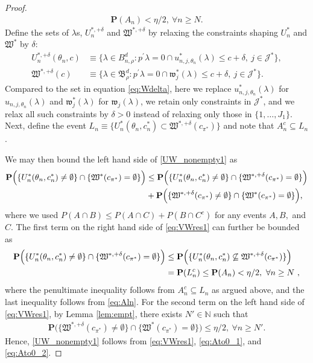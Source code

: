 \documentclass[letterpaper,11pt]{article}
\theoremstyle{myplain}
\theoremstyle{mydefinition}
\theoremstyle{myremark}
\newcommand{\cJ}{\mathcal{J}}
\numberwithin{equation}{section}
\numberwithin{figure}{section}
\begin{document}
\begin{appendices}
\begin{proof}
\begin{align}
\mathbf{P}(A_{n})< \eta/2,~\forall n \ge N.\label{eq:Aln}
\end{align}
Define the sets of $\lambda$s, $U_n^{*,+\delta}$ and $\mathfrak{W}^{*,+\delta}$ by relaxing the constraints shaping  $U_n^*$ and $\mathfrak{W}^{*}$ by $\delta$:
\begin{align}
U_n^{*,+\delta}(\theta_n,c) &\equiv \{\lambda\in  B^d_{n,\rho}: p^\prime \lambda =0 \cap u^*_{n,j,\theta_n}(\lambda)\le c+\delta,~j \in \cJ^*\},\\
\mathfrak W^{*,+\delta}(c)&\equiv \{\lambda\in  \mathfrak B^d_\rho: p^\prime \lambda =0 \cap \mathfrak{w}^*_{j}(\lambda)\le c+\delta,~j \in \cJ^*\}.
\end{align}
Compared to the set in equation \eqref{eq:Wdelta}, here we replace $u^*_{n,j,\theta_n}(\lambda)$ for $u_{n,j,\theta_n}(\lambda)$ and $\mathfrak{w}^*_{j}(\lambda)$ for $\mathfrak{w}_{j}(\lambda)$, we retain only constraints in $\cJ^*$, and we relax all such constraints by $\delta>0$ instead of relaxing only those in $\{1,\dots,J_1\}$.
Next, define the event $L_{ n}\equiv\{ U_n^{*}(\theta_n,c^*_n)\subset \mathfrak W^{*,+\delta}(c_{\pi^*})\}$ and note that $A^c_{n}\subseteq L_{n}$. 

We may then bound the left hand side of \eqref{UW_nonempty1} as
\begin{align}
\mathbf{P}\Big(\{ U^*_{n}(\theta_n,c^*_n)\ne \emptyset \} \cap \{\mathfrak W^{*}(c_{\pi^*})= \emptyset \}\Big)
&\le \mathbf{P}\Big( \{ U^{*}_{n}(\theta_n,c^*_n)\ne \emptyset \} \cap \{\mathfrak W^{*,+\delta}(c_{\pi^*})=\emptyset \}\Big)\notag\\
&+\mathbf{P}\Big(\{\mathfrak W^{*,+\delta}(c_{\pi^*})\ne \emptyset \}\cap \{\mathfrak W^{*}(c_{\pi^*})=\emptyset \}\Big), \label{eq:VWres1}
\end{align}
where we used $P(A\cap B)\le P(A\cap C)+P(B\cap C^c)$ for any events $A,B,$ and $C.$ The first term on the right hand side of \eqref{eq:VWres1} can further be bounded as
\begin{align}
\mathbf{P}\Big( \{ U^{*}_{n}(\theta_n,c^*_n)\ne \emptyset \} \cap \{\mathfrak W^{*,+\delta}(c_{\pi^*})=\emptyset \}\Big)
&\le \mathbf{P}\Big(\{U^{*}_{n}(\theta_n,c^*_n)\not\subseteq\mathfrak W^{*,+\delta}(c_{\pi^*}) \} \Big) \notag\\
&= \mathbf {P}(L_{n}^c)\le\mathbf{P}(A_{n})<\eta/2,~\forall n\ge N~, \label{eq:Ato0_1}
\end{align}
where the penultimate inequality follows from $A^c_{n}\subseteq L_{n}$ as argued above, and the last inequality follows from \eqref{eq:Aln}.
For the second term on the left hand side of \eqref{eq:VWres1}, by  Lemma \ref{lem:empt}, there exists $N'\in\mathbb N$ such that
\begin{align}
\mathbf{P}\Big(\{\mathfrak W^{*,+\delta}(c_{\pi^*})\ne \emptyset \}\cap \{\mathfrak W^{*}(c_{\pi^*})=\emptyset \}\Big) \le \eta/2, ~\forall n\ge N'.\label{eq:Ato0_2}
\end{align}
Hence,  \eqref{UW_nonempty1} follows from \eqref{eq:VWres1}, \eqref{eq:Ato0_1}, and \eqref{eq:Ato0_2}.



\end{proof}
\end{appendices}
\end{document}
